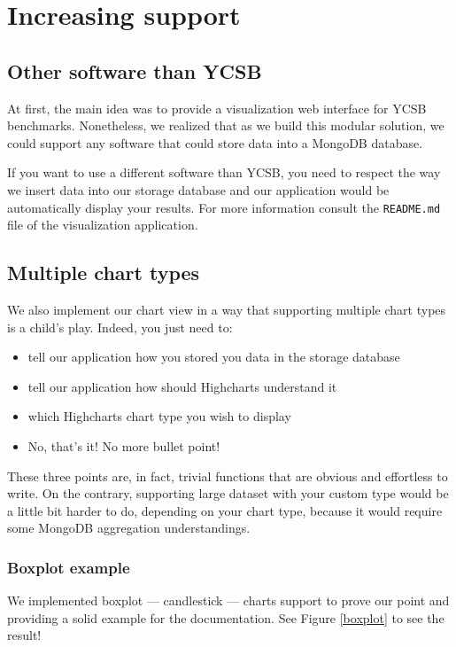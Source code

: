 \documentclass[a4paper,11pt]{report}
\begin{document}
\section{Increasing support}

\subsection{Other software than YCSB}

At first, the main idea was to provide a visualization web interface for YCSB benchmarks. Nonetheless, we realized that as we build this modular solution, we could support any software that could store data into a MongoDB database.

If you want to use a different software than YCSB, you need to respect the way we insert data into our storage database and our application would be automatically display your results. For more information consult the \texttt{README.md} file of the visualization application.

\subsection{Multiple chart types}

We also implement our chart view in a way that supporting multiple chart types is a child's play. Indeed, you just need to:

\begin{itemize}
\item
tell our application how you stored you data in the storage database
\item
tell our application how should Highcharts understand it
\item
which Highcharts chart type you wish to display
\item
No, that's it! No more bullet point!
\end{itemize}

These three points are, in fact, trivial functions that are obvious and effortless to write. On the contrary, supporting large dataset with your custom type would be a little bit harder to do, depending on your chart type, because it would require some MongoDB aggregation understandings.

\subsubsection{Boxplot example}

We implemented boxplot --- candlestick --- charts support to prove our point and providing a solid example for the documentation. See Figure \ref{boxplot} to see the result!
\end{document}

